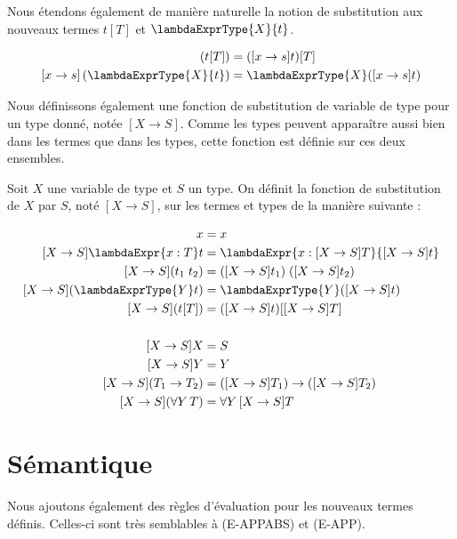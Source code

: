 Nous étendons également de manière naturelle la notion de substitution aux
nouveaux termes $t[T]$ et $\lambdaExprType{X}{t}$.

\begin{align*}
  [x \rightarrow s] \, (t[T]) & = ([x \rightarrow s]t)[T] \\
  [x \rightarrow s] \, (\lambdaExprType{X}{t}) & = \lambdaExprType{X}([x \rightarrow s]t)
\end{align*}

Nous définissons également une fonction de substitution de variable de type pour
un type donné, notée $[X \rightarrow S]$. Comme les types peuvent apparaître
aussi bien dans les termes que dans les types, cette fonction est définie sur
ces deux ensembles.

\begin{definition}
  Soit $X$ une variable de type et $S$ un type. On définit la fonction de
  substitution de $X$ par $S$, noté $[X \rightarrow S]$, sur les termes et types
  de la manière suivante :

  \begin{align*}
    [X \rightarrow S]x & = x \\
    [X \rightarrow S]\lambdaExpr{x : T} t & = \lambdaExpr{x : [X \rightarrow S]T}{[X \rightarrow S]t} \\
    [X \rightarrow S](t_{1} \; t_{2}) & = ([X \rightarrow S]t_{1}) \; ([X \rightarrow S]t_{2}) \\
    [X \rightarrow S](\lambdaExprType{Y} t) & = \lambdaExprType{Y}([X \rightarrow S] t) \\
    [X \rightarrow S](t[T]) & = ([X \rightarrow S] t)[[X \rightarrow S] T] \\
    \\
    [X \rightarrow S]X & = S \\
    [X \rightarrow S]Y & = Y \\
    [X \rightarrow S](T_{1} \rightarrow T_{2}) & = ([X \rightarrow S]T_{1}) \rightarrow ([X \rightarrow S] T_{2}) \\
    [X \rightarrow S](\forall Y \, T) & = \forall Y \, [X \rightarrow S]T
  \end{align*}
\end{definition}
\section{Sémantique}

Nous ajoutons également des règles d'évaluation pour les nouveaux termes
définis. Celles-ci sont très semblables à (E-APPABS) et (E-APP).

